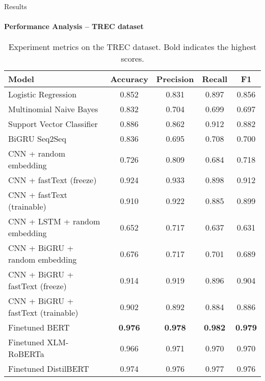 \begin{frame}{Results}
\framesubtitle{Performance Analysis -- TREC dataset}

\begin{table}
\small{
\begin{tabular*}{\linewidth}{@{\extracolsep\fill}lcccc}
\hline
\textbf{Model}                & \textbf{Accuracy} & \textbf{Precision} & \textbf{Recall} &  \textbf{F1} \\ \hline
Logistic Regression   & 0.852 & 0.831          & 0.897       & 0.856  \\ 
Multinomial Naive Bayes   & 0.832 & 0.704          & 0.699       & 0.697 \\ 
Support Vector Classifier & 0.886 & 0.862          & 0.912       & 0.882  \\ \hline
BiGRU Seq2Seq            & 0.836 & 0.695          & 0.708       & 0.700  \\ \hline
CNN + random embedding                 & 0.726 & 0.809          & 0.684       & 0.718   \\
CNN + fastText (freeze)   & 0.924 & 0.933          & 0.898       & 0.912    \\
CNN + fastText (trainable) & 0.910 & 0.922          & 0.885       & 0.899    \\ \hline
CNN + LSTM + random embedding  & 0.652 & 0.717          & 0.637       & 0.631  \\
CNN + BiGRU + random embedding     & 0.676 & 0.717          & 0.701       & 0.689   \\
CNN + BiGRU + fastText (freeze)   & 0.914 & 0.919          & 0.896       & 0.904  \\
CNN + BiGRU + fastText (trainable) & 0.902 & 0.892          & 0.884       & 0.886 \\ \hline
Finetuned BERT & \textbf{0.976} & \textbf{0.978} & \textbf{0.982} & \textbf{0.979}  \\
Finetuned XLM-RoBERTa & 0.966 & 0.971          & 0.970       & 0.970  \\ \hline
Finetuned DistilBERT  & 0.974 & 0.976 & 0.977  & 0.976  \\ \hline
\end{tabular*}
}
\caption{Experiment metrics on the TREC dataset. Bold indicates the highest scores.} \label{tab:result-TREC}
\end{table}
\end{frame}

